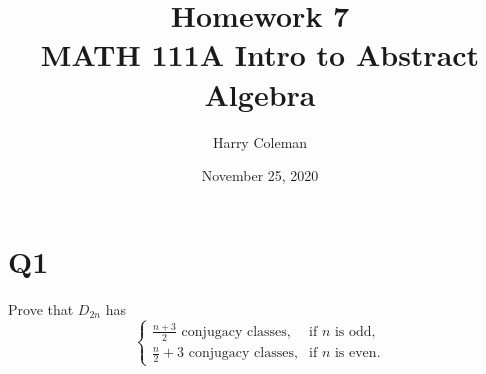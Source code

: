 \documentclass[12pt]{article}
\newenvironment{problem}
    {\begin{lrbox}{\mybox}\begin{minipage}{0.98\textwidth}}
    {\end{minipage}\end{lrbox}\framebox[\textwidth]{\usebox{\mybox}}}
\newcommand{\<}{\left\langle} %
\renewcommand{\>}{\right\rangle} %
\begin{document}
 
\title{Homework 7\\
    \large MATH 111A Intro to Abstract Algebra
}
\author{Harry Coleman}
\date{November 25, 2020}
\maketitle

\section*{Q1}
\begin{problem}
    Prove that $D_{2n}$ has
    \[\begin{cases}
        \frac{n+3}{2} \text{ conjugacy classes,} &\text{if $n$ is odd}, \\
        \frac{n}{2}+3 \text{ conjugacy classes,} &\text{if $n$ is even}.
    \end{cases}\]
\end{problem}
\end{document}

